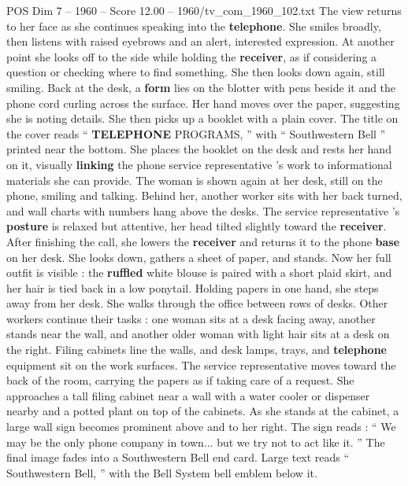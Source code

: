\begin{textsample}{POS Dim 7 – 1960 – Score 12.00 – 1960/tv\_com\_1960\_102.txt}
The view returns to her face as she continues speaking into the \textbf{telephone}.
She smiles broadly, then listens with raised eyebrows and an alert, interested expression.
At another point she looks off to the side while holding the \textbf{receiver}, as if considering a question or checking where to find something.
She then looks down again, still smiling.
Back at the desk, a \textbf{form} lies on the blotter with pens beside it and the phone cord curling across the surface.
Her hand moves over the paper, suggesting she is noting details.
She then picks up a booklet with a plain cover.
The title on the cover reads “ \textbf{TELEPHONE} PROGRAMS, ” with “ Southwestern Bell ” printed near the bottom.
She places the booklet on the desk and rests her hand on it, visually \textbf{linking} the phone service representative ’s work to informational materials she can provide.
The woman is shown again at her desk, still on the phone, smiling and talking.
Behind her, another worker sits with her back turned, and wall charts with numbers hang above the desks.
The service representative ’s \textbf{posture} is relaxed but attentive, her head tilted slightly toward the \textbf{receiver}.
After finishing the call, she lowers the \textbf{receiver} and returns it to the phone \textbf{base} on her desk.
She looks down, gathers a sheet of paper, and stands.
Now her full outfit is visible : the \textbf{ruffled} white blouse is paired with a short plaid skirt, and her hair is tied back in a low ponytail.
Holding papers in one hand, she steps away from her desk.
She walks through the office between rows of desks.
Other workers continue their tasks : one woman sits at a desk facing away, another stands near the wall, and another older woman with light hair sits at a desk on the right.
Filing cabinets line the walls, and desk lamps, trays, and \textbf{telephone} equipment sit on the work surfaces.
The service representative moves toward the back of the room, carrying the papers as if taking care of a request.
She approaches a tall filing cabinet near a wall with a water cooler or dispenser nearby and a potted plant on top of the cabinets.
As she stands at the cabinet, a large wall sign becomes prominent above and to her right.
The sign reads : “ We may be the only phone company in town... but we try not to act like it. ” The final image fades into a Southwestern Bell end card.
Large text reads “ Southwestern Bell, ” with the Bell System bell emblem below it.

\end{textsample}
